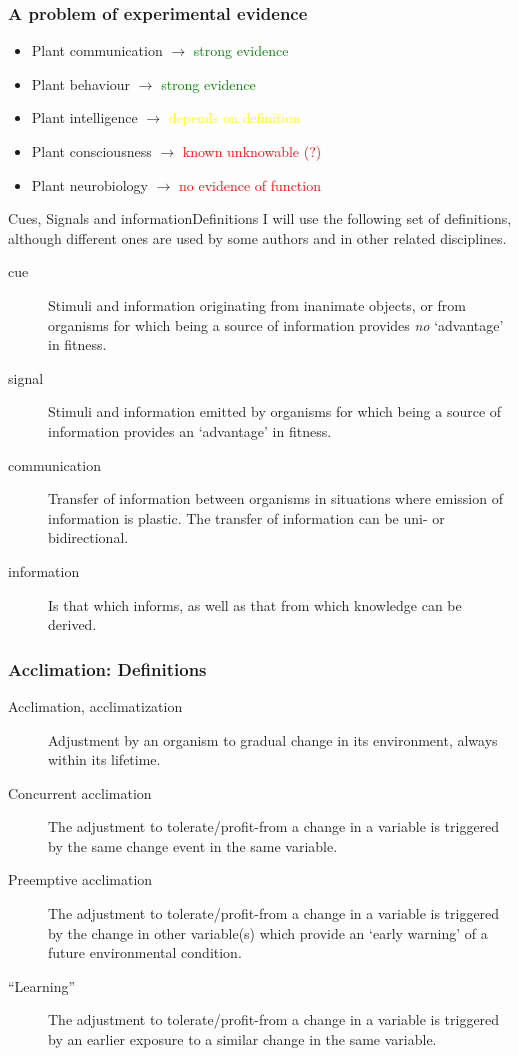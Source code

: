 \documentclass[10pt]{beamer}
\begin{document}
\begin{frame}
\frametitle{A problem of experimental evidence}
\begin{itemize}
\item Plant communication $\rightarrow$ \textcolor{green}{strong evidence}
\item Plant behaviour $\rightarrow$ \textcolor{green}{strong evidence}
\item Plant intelligence $\rightarrow$ \textcolor{yellow}{depends on definition}
\item Plant consciousness $\rightarrow$ \textcolor{red}{known unknowable (?)}
\item Plant neurobiology $\rightarrow$ \textcolor{red}{no evidence of function}
\end{itemize}
\end{frame}

\begin{frame}{Cues, Signals and information}{Definitions}
I will use the following set of definitions, although different ones are used by some authors and in other related disciplines.
  \begin{description}
     \item[cue] Stimuli and information originating from inanimate objects, or from organisms for which being a source of information provides \emph{no} `advantage' in fitness.
     \item[signal] Stimuli and information emitted by organisms for which being a source of information provides an `advantage' in fitness.
     \item[communication] Transfer of information between organisms in situations where emission of information is plastic. The transfer of information can be uni- or bidirectional.
     \item[information] Is that which informs, as well as that from which knowledge can be derived.
  \end{description}
\end{frame}

\begin{frame}
  \frametitle{Acclimation: Definitions}
  \begin{description}
    \item[Acclimation, acclimatization] Adjustment by an organism to gradual change in its environment, always within its lifetime.
    \item[Concurrent acclimation] The adjustment to tolerate/profit-from a change in a variable is triggered by the same change event in the same variable.
    \item[Preemptive acclimation] The adjustment to tolerate/profit-from a change in a variable is triggered by the change in other variable(s) which provide an `early warning' of a future environmental condition.
    \item[``Learning''] The adjustment to tolerate/profit-from a change in a variable is triggered by an earlier exposure to a similar change in the same variable.
  \end{description}
\end{frame}
\end{document}
